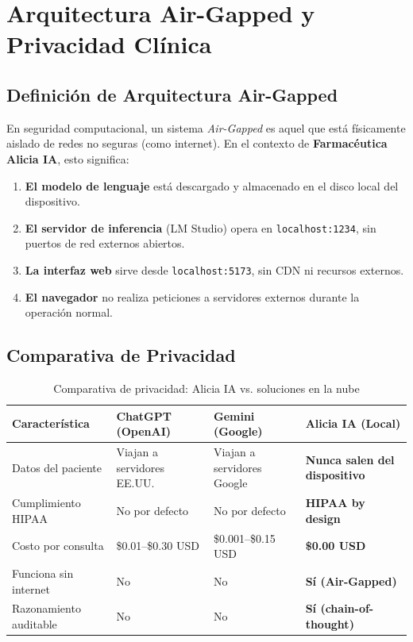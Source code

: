 \documentclass[12pt,a4paper]{article}
\begin{document}
\section{Arquitectura Air-Gapped y Privacidad Clínica}

\subsection{Definición de Arquitectura Air-Gapped}

En seguridad computacional, un sistema \textit{Air-Gapped} es aquel que está físicamente
aislado de redes no seguras (como internet). En el contexto de \textbf{Farmacéutica Alicia IA},
esto significa:

\begin{enumerate}
  \item \textbf{El modelo de lenguaje} está descargado y almacenado en el disco local del
    dispositivo.
  \item \textbf{El servidor de inferencia} (LM Studio) opera en \texttt{localhost:1234}, sin
    puertos de red externos abiertos.
  \item \textbf{La interfaz web} sirve desde \texttt{localhost:5173}, sin CDN ni recursos externos.
  \item \textbf{El navegador} no realiza peticiones a servidores externos durante la operación normal.
\end{enumerate}

\subsection{Comparativa de Privacidad}

\begin{table}[H]
  \centering
  \caption{Comparativa de privacidad: Alicia IA vs. soluciones en la nube}
  \begin{tabularx}{\textwidth}{lXXX}
    \toprule
    \textbf{Característica} & \textbf{ChatGPT (OpenAI)} & \textbf{Gemini (Google)} & \textbf{Alicia IA (Local)} \\
    \midrule
    Datos del paciente & Viajan a servidores EE.UU. & Viajan a servidores Google & \textbf{Nunca salen del dispositivo} \\
    \midrule
    Cumplimiento HIPAA & No por defecto & No por defecto & \textbf{HIPAA by design} \\
    \midrule
    Costo por consulta & \$0.01--\$0.30 USD & \$0.001--\$0.15 USD & \textbf{\$0.00 USD} \\
    \midrule
    Funciona sin internet & No & No & \textbf{Sí (Air-Gapped)} \\
    \midrule
    Razonamiento auditable & No & No & \textbf{Sí (chain-of-thought)} \\
    \bottomrule
  \end{tabularx}
\end{table}
\end{document}
